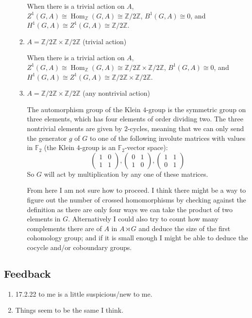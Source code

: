 \documentclass[11pt]{article}
\DeclareMathOperator{\Hom}{Hom}
\begin{document}
\begin{enumerate}
\begin{enumerate}
        When there is a trivial action on $A$, $Z^1(G,A)\cong \Hom_{\mathbb{Z}}(G,A)\cong \mathbb{Z}/2\mathbb{Z}$, $B^1(G,A)\cong 0$, and $H^1(G,A) \cong Z^1(G,A)\cong \mathbb{Z}/2\mathbb{Z}$.
        \item $A = \mathbb{Z}/2\mathbb{Z}\times \mathbb{Z}/2\mathbb{Z}$ (trivial action)

        
        When there is a trivial action on $A$, $Z^1(G,A)\cong \Hom_{\mathbb{Z}}(G,A)\cong \mathbb{Z}/2\mathbb{Z}\times \mathbb{Z}/2\mathbb{Z}$, $B^1(G,A)\cong 0$, and $H^1(G,A) \cong Z^1(G,A)\cong \mathbb{Z}/2\mathbb{Z}\times \mathbb{Z}/2\mathbb{Z}$.
        \item $A =\mathbb{Z}/2\mathbb{Z}\times \mathbb{Z}/2\mathbb{Z}$ (any nontrivial action)

        The automorphism group of the Klein $4$-group is the symmetric group on three elements, which has four elements of order dividing two. The three nontrivial elements are given by $2$-cycles, meaning that we can only send the generator $g$ of $G$ to one of the following involute matrices with values in $\mathbb{F}_2$ (the Klein $4$-group is an $\mathbb{F}_2$-vector space): \[\begin{pmatrix} 1 & 0 \\ 1 & 1 \end{pmatrix},\begin{pmatrix} 0 & 1 \\ 1 & 0 \end{pmatrix},\begin{pmatrix} 1 & 1 \\ 0 & 1 \end{pmatrix}\] So $G$ will act by multiplication by any one of these matrices.

        From here I am not sure how to proceed. I think there might be a way to figure out the number of crossed homomorphisms by checking against the definition as there are only four ways we can take the product of two elements in $G$. Alternatively I could also try to count how many complements there are of $A$ in $A\rtimes G$ and deduce the size of the first cohomology group; and if it is small enough I might be able to deduce the cocycle and/or coboundary groups.
    \end{enumerate}
\end{enumerate}
\subsection*{Feedback}
\begin{enumerate}
    \item 17.2.22 to me is a little suspicious/new to me.
    \item Things seem to be the same I think.
\end{enumerate}
\end{document}
